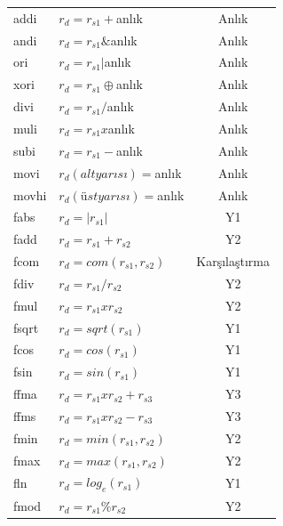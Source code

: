 \begin{longtable}{p{50pt} p{300pt} p{70pt}}
\hline \hline
\endlastfoot
  addi		&	 $r_{d} = r_{s1} + 			$anlık 	& \multicolumn{1}{c}{Anlık} 	\\
  andi 		&	 $r_{d} = r_{s1} \& 		$anlık 	& \multicolumn{1}{c}{Anlık}  	\\
  ori 		&	 $r_{d} = r_{s1} | 			$anlık  & \multicolumn{1}{c}{Anlık}  	\\
  xori 		&	 $r_{d} = r_{s1} \oplus $anlık 	& \multicolumn{1}{c}{Anlık}  	\\
  divi 		&	 $r_{d} = r_{s1} / 			$anlık  & \multicolumn{1}{c}{Anlık}  	\\
  muli 		&	 $r_{d} = r_{s1} x 			$anlık  & \multicolumn{1}{c}{Anlık}  	\\
  subi 		&	 $r_{d} = r_{s1} - 			$anlık  & \multicolumn{1}{c}{Anlık}  	\\
  movi 		&	 $r_{d}(alt yarısı) = 	$anlık  & \multicolumn{1}{c}{Anlık}  	\\
  movhi		&	 $r_{d}(üst yarısı) = 	$anlık  & \multicolumn{1}{c}{Anlık}  	\\
  fabs  	&  $r_{d} = |r_{s1}|			$				&	\multicolumn{1}{c}{Y1}		 	\\
  fadd  	&  $r_{d} = r_{s1} + r_{s2}$			&	\multicolumn{1}{c}{Y2}		 	\\
  fcom  	&  $r_{d} = com(r_{s1},r_{s2})$		&	\multicolumn{1}{c}{Karşılaştırma}	 	\\
  fdiv  	&  $r_{d} = r_{s1} / r_{s2}$			&	\multicolumn{1}{c}{Y2}		 	\\
  fmul  	&  $r_{d} = r_{s1} x r_{s2}$			&	\multicolumn{1}{c}{Y2}		 	\\
  fsqrt  	&  $r_{d} = sqrt(r_{s1})$					&	\multicolumn{1}{c}{Y1}		 	\\
  fcos  	&  $r_{d} = cos(r_{s1})$					&	\multicolumn{1}{c}{Y1}		 	\\
  fsin  	&  $r_{d} = sin(r_{s1})$					&	\multicolumn{1}{c}{Y1}		 	\\
  ffma  	&  $r_{d} = r_{s1}xr_{s2}+r_{s3}$	&	\multicolumn{1}{c}{Y3}		 	\\
  ffms  	&  $r_{d} = r_{s1}xr_{s2}-r_{s3}$	&	\multicolumn{1}{c}{Y3}		 	\\
  fmin  	&  $r_{d} = min(r_{s1},r_{s2})$		&	\multicolumn{1}{c}{Y2}		 	\\
  fmax  	&  $r_{d} = max(r_{s1},r_{s2})$		& \multicolumn{1}{c}{Y2}			\\
  fln 	 	&	 $r_{d} = log_{e}(r_{s1})$			& \multicolumn{1}{c}{Y1}			\\
  fmod 		&	 $r_{d} = r_{s1} \% r_{s2} $ 		& \multicolumn{1}{c}{Y2}  		\\

\end{longtable}
